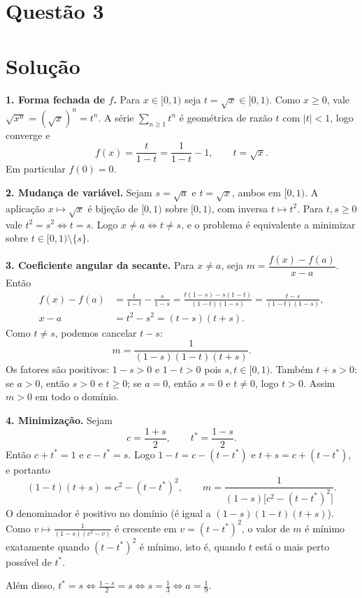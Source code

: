 \documentclass{article}%
\begin{document}
\section*{Questão 3}

\section*{Solução}

\textbf{1. Forma fechada de $f$.} Para $x\in[0,1)$ seja $t=\sqrt{x}\in[0,1)$. Como $x\ge 0$, vale $\sqrt{x^n}=(\sqrt{x})^n=t^n$. A série $\sum_{n\ge 1}t^n$ é geométrica de razão $t$ com $|t|<1$, logo converge e
\[
f(x)=\frac{t}{1-t}=\frac{1}{1-t}-1,\qquad t=\sqrt{x}.
\]
Em particular $f(0)=0$.

\textbf{2. Mudança de variável.} Sejam $s=\sqrt{a}$ e $t=\sqrt{x}$, ambos em $[0,1)$. A aplicação $x\mapsto\sqrt{x}$ é bijeção de $[0,1)$ sobre $[0,1)$, com inversa $t\mapsto t^2$. Para $t,s\ge 0$ vale $t^2=s^2\Leftrightarrow t=s$. Logo $x\neq a\Leftrightarrow t\neq s$, e o problema é equivalente a minimizar sobre $t\in[0,1)\setminus\{s\}$.

\textbf{3. Coeficiente angular da secante.} Para $x\neq a$, seja $m=\dfrac{f(x)-f(a)}{x-a}$. Então
\begin{align*}
f(x)-f(a)&=\frac{t}{1-t}-\frac{s}{1-s}=\frac{t(1-s)-s(1-t)}{(1-t)(1-s)}=\frac{t-s}{(1-t)(1-s)},\\
x-a&=t^2-s^2=(t-s)(t+s).
\end{align*}
Como $t\neq s$, podemos cancelar $t-s$:
\[
m=\frac{1}{(1-s)(1-t)(t+s)}.
\]
Os fatores são positivos: $1-s>0$ e $1-t>0$ pois $s,t\in[0,1)$. Também $t+s>0$: se $a>0$, então $s>0$ e $t\ge 0$; se $a=0$, então $s=0$ e $t\neq 0$, logo $t>0$. Assim $m>0$ em todo o domínio.

\textbf{4. Minimização.} Sejam
\[
c=\frac{1+s}{2},\qquad t^*=\frac{1-s}{2}.
\]
Então $c+t^*=1$ e $c-t^*=s$. Logo $1-t=c-(t-t^*)$ e $t+s=c+(t-t^*)$, e portanto
\[
(1-t)(t+s)=c^2-(t-t^*)^2,\qquad m=\frac{1}{(1-s)\bigl[c^2-(t-t^*)^2\bigr]}.
\]
O denominador é positivo no domínio (é igual a $(1-s)(1-t)(t+s)$). Como $v\mapsto \frac{1}{(1-s)(c^2-v)}$ é crescente em $v=(t-t^*)^2$, o valor de $m$ é mínimo exatamente quando $(t-t^*)^2$ é mínimo, isto é, quando $t$ está o mais perto possível de $t^*$.

Além disso, $t^*=s\Leftrightarrow\frac{1-s}{2}=s\Leftrightarrow s=\frac13\Leftrightarrow a=\frac19$.
\end{document}
